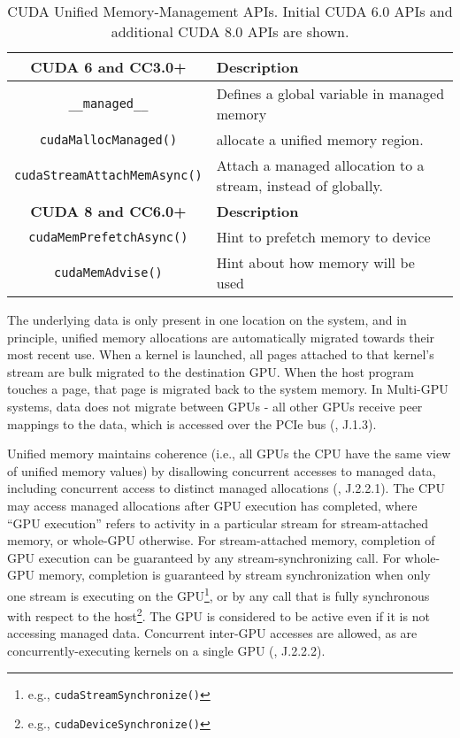 \begin{table}[ht]
	\centering
	\caption[CUDA Unified Memory-Management APIs]{
		CUDA Unified Memory-Management APIs.
		Initial CUDA 6.0 APIs and additional CUDA 8.0 APIs are shown.
	}
	\label{tab:cuda-um-apis}
	\begin{tabularx}{\textwidth}{cY}
		\hline
		\textbf{CUDA 6 and CC3.0+}           & \textbf{Description}                        \\ \hline
		\texttt{\_\_managed\_\_}             & Defines a global variable in managed memory \\ \hline
		\texttt{cudaMallocManaged()}         & allocate a unified memory region.           \\ \hline
		\texttt{cudaStreamAttachMemAsync()}  & Attach a managed allocation to a stream, instead of globally. \\ \hline \hline
		\textbf{CUDA 8 and CC6.0+}           & \textbf{Description}               \\ \hline
		\texttt{cudaMemPrefetchAsync()}      & Hint to prefetch memory to device  \\ \hline
		\texttt{cudaMemAdvise()}             & Hint about how memory will be used \\ \hline

	\end{tabularx}
\end{table}

The underlying data is only present in one location on the system, and in principle, unified memory allocations are automatically migrated towards their most recent use.
When a kernel is launched, all pages attached to that kernel's stream are bulk migrated to the destination GPU.
When the host program touches a page, that page is migrated back to the system memory.
In Multi-GPU systems, data does not migrate between GPUs - all other GPUs receive peer mappings to the data, which is accessed over the PCIe bus (\cite{nvidia2014cuda60}, J.1.3).

Unified memory maintains coherence (i.e., all GPUs the CPU have the same view of unified memory values) by disallowing concurrent accesses to managed data, including concurrent access to distinct managed allocations (\cite{nvidia2014cuda60}, J.2.2.1).
The CPU may access managed allocations after GPU execution has completed, where ``GPU execution'' refers to activity in a particular stream for stream-attached memory, or whole-GPU otherwise.
For stream-attached memory, completion of GPU execution can be guaranteed by any stream-synchronizing call.
For whole-GPU memory, completion is guaranteed by stream synchronization when only one stream is executing on the GPU\footnote{e.g., \texttt{cudaStreamSynchronize()}}, or by any call that is fully synchronous with respect to the host\footnote{e.g., \texttt{cudaDeviceSynchronize()}}.
The GPU is considered to be active even if it is not accessing managed data.
Concurrent inter-GPU accesses are allowed, as are concurrently-executing kernels on a single GPU (\cite{nvidia2014cuda60}, J.2.2.2).

